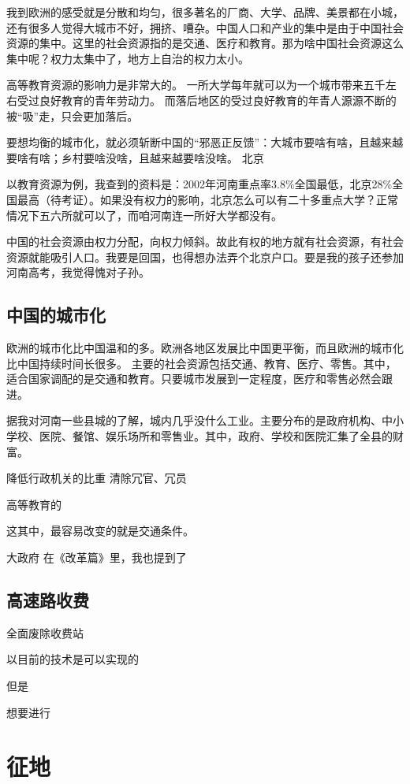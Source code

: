 我到欧洲的感受就是分散和均匀，很多著名的厂商、大学、品牌、美景都在小城，还有很多人觉得大城市不好，拥挤、嘈杂。中国人口和产业的集中是由于中国社会资源的集中。这里的社会资源指的是交通、医疗和教育。那为啥中国社会资源这么集中呢？权力太集中了，地方上自治的权力太小。


\zPar
高等教育资源的影响力是非常大的。
一所大学每年就可以为一个城市带来五千左右受过良好教育的青年劳动力。
而落后地区的受过良好教育的年青人源源不断的被“吸”走，只会更加落后。

要想均衡的城市化，就必须斩断中国的“邪恶正反馈”：大城市要啥有啥，且越来越要啥有啥；乡村要啥没啥，且越来越要啥没啥。
北京

\zPar
以教育资源为例，我查到的资料是：2002年河南重点率3.8\%全国最低，北京28\%全国最高（待考证）。如果没有权力的影响，北京怎么可以有二十多重点大学？正常情况下五六所就可以了，而咱河南连一所好大学都没有。

中国的社会资源由权力分配，向权力倾斜。故此有权的地方就有社会资源，有社会资源就能吸引人口。我要是回国，也得想办法弄个北京户口。要是我的孩子还参加河南高考，我觉得愧对子孙。

\subsection{中国的城市化}

欧洲的城市化比中国温和的多。欧洲各地区发展比中国更平衡，而且欧洲的城市化比中国持续时间长很多。
主要的社会资源包括交通、教育、医疗、零售。其中，适合国家调配的是交通和教育。只要城市发展到一定程度，医疗和零售必然会跟进。

据我对河南一些县城的了解，城内几乎没什么工业。主要分布的是政府机构、中小学校、医院、餐馆、娱乐场所和零售业。其中，政府、学校和医院汇集了全县的财富。

降低行政机关的比重
	清除冗官、冗员

高等教育的

这其中，最容易改变的就是交通条件。

大政府
在《改革篇》里，我也提到了

\subsection{高速路收费}


全面废除收费站

以目前的技术是可以实现的

但是


想要进行

\section{征地}

